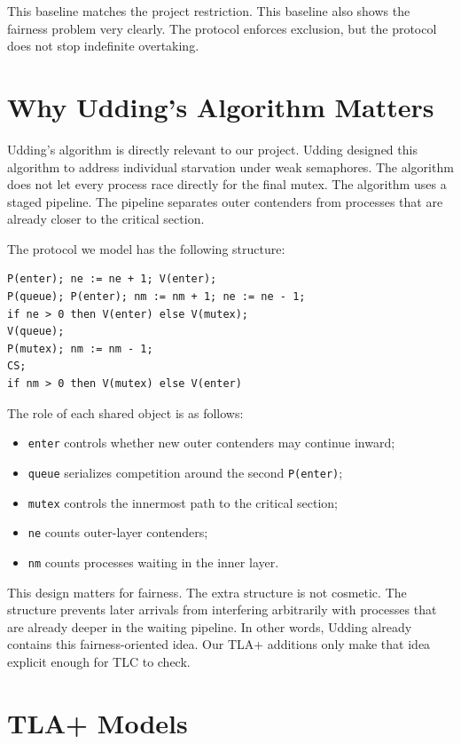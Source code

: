 \documentclass[11pt]{article}
\begin{document}
This baseline matches the project restriction. This baseline also shows the fairness problem very clearly. The protocol enforces exclusion, but the protocol does not stop indefinite overtaking.

\section{Why Udding's Algorithm Matters}

Udding's algorithm is directly relevant to our project. Udding designed this algorithm to address individual starvation under weak semaphores. The algorithm does not let every process race directly for the final mutex. The algorithm uses a staged pipeline. The pipeline separates outer contenders from processes that are already closer to the critical section.

The protocol we model has the following structure:

\begin{lstlisting}
P(enter); ne := ne + 1; V(enter);
P(queue); P(enter); nm := nm + 1; ne := ne - 1;
if ne > 0 then V(enter) else V(mutex);
V(queue);
P(mutex); nm := nm - 1;
CS;
if nm > 0 then V(mutex) else V(enter)
\end{lstlisting}

The role of each shared object is as follows:

\begin{itemize}
  \item \texttt{enter} controls whether new outer contenders may continue inward;
  \item \texttt{queue} serializes competition around the second \texttt{P(enter)};
  \item \texttt{mutex} controls the innermost path to the critical section;
  \item \texttt{ne} counts outer-layer contenders;
  \item \texttt{nm} counts processes waiting in the inner layer.
\end{itemize}

This design matters for fairness. The extra structure is not cosmetic. The structure prevents later arrivals from interfering arbitrarily with processes that are already deeper in the waiting pipeline. In other words, Udding already contains this fairness-oriented idea. Our TLA+ additions only make that idea explicit enough for TLC to check.

\section{TLA+ Models}
\end{document}
